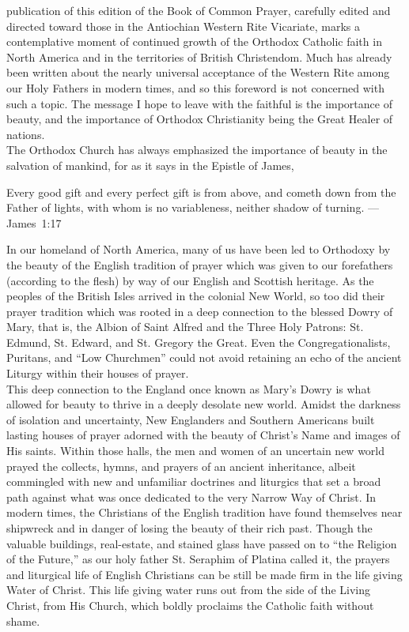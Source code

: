 {}
\noindent
{} publication of this edition of the Book of Common Prayer, carefully edited and directed toward those in the Antiochian Western Rite Vicariate, marks a contemplative moment of continued growth of the Orthodox Catholic faith in North America and in the territories of British Christendom. Much has already been written about the nearly universal acceptance of the Western Rite among our Holy Fathers in modern times, and so this foreword is not concerned with such a topic. The message I hope to leave with the faithful is the importance of beauty, and the importance of Orthodox Christianity being the Great Healer of nations.\\

The Orthodox Church has always emphasized the importance of beauty in the salvation of mankind, for as it says in the Epistle of James,

\begin{quoting}\noindent
	Every good gift and every perfect gift is from above, and cometh down from the Father of lights, with whom is no variableness, neither shadow of turning. ---James~1:17
\end{quoting}

In our homeland of North America, many of us have been led to Orthodoxy by the beauty of the English tradition of prayer which was given to our forefathers (according to the flesh) by way of our English and Scottish heritage. As the peoples of the British Isles arrived in the colonial New World, so too did their prayer tradition which was rooted in a deep connection to the blessed Dowry of Mary, that is, the Albion of Saint Alfred and the Three Holy Patrons: St. Edmund, St. Edward, and St. Gregory the Great. Even the Congregationalists, Puritans, and ``Low Churchmen'' could not avoid retaining an echo of the ancient Liturgy within their houses of prayer. \\

This deep connection to the England once known as Mary's Dowry is what allowed for beauty to thrive in a deeply desolate new world. Amidst the darkness of isolation and uncertainty, New Englanders and Southern Americans built lasting houses of prayer adorned with the beauty of Christ's Name and images of His saints. Within those halls, the men and women of an uncertain new world prayed the collects, hymns, and prayers of an ancient inheritance, albeit commingled with new and unfamiliar doctrines and liturgics that set a broad path against what was once dedicated to the very Narrow Way of Christ. In modern times, the Christians of the English tradition have found themselves near shipwreck and in danger of losing the beauty of their rich past. Though the valuable buildings, real-estate, and stained glass have passed on to ``the Religion of the Future,'' as our holy father St. Seraphim of Platina called it, the prayers and liturgical life of English Christians can be still be made firm in the life giving Water of Christ. This life giving water runs out from the side of the Living Christ, from His Church, which boldly proclaims the Catholic faith without shame.\\

